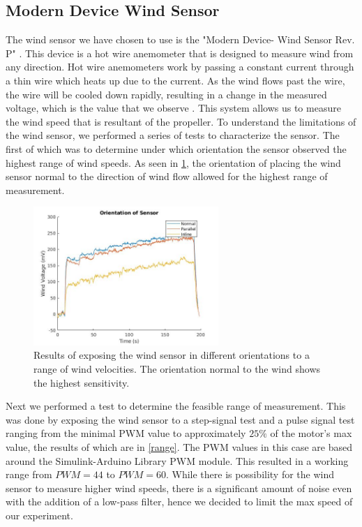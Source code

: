 \documentclass[conference]{IEEEtran}
\begin{document}
\subsection{Modern Device Wind Sensor}
The wind sensor we have chosen to use is the "Modern Device- Wind Sensor Rev. P" \cite{md}. This device is a hot wire anemometer that is designed to measure wind from any direction. Hot wire anemometers work by passing a constant current through a thin wire which heats up due to the current. As the wind flows past the wire, the wire will be cooled down rapidly, resulting in a change in the measured voltage, which is the value that we observe \cite{hot_wire}. This system allows us to measure the wind speed that is resultant of the propeller. 
To understand the limitations of the wind sensor, we performed a series of tests to characterize the sensor. The first of which was to determine under which orientation the sensor observed the highest range of wind speeds. As seen in \ref{orientation}, the orientation of placing the wind sensor normal to the direction of wind flow allowed for the highest range of measurement. 
	\begin{figure}[htbp]
	\includegraphics[width=7cm]{images/figure_1/orientation.jpg}
	\caption{Results of exposing the wind sensor in different orientations to a range of wind velocities. The orientation normal to the wind shows the highest sensitivity. }
	\label{orientation}
\end{figure}
Next we performed a test to determine the feasible range of measurement. This was done by exposing the wind sensor to a step-signal test and a pulse signal test ranging from the minimal PWM value to approximately $25\%$ of the motor's max value, the results of which are in \ref{range}. The PWM values in this case are based around the Simulink-Arduino Library PWM module.  This resulted in a working range from $PWM = 44$ to $PWM = 60$. While there is possibility for the wind sensor to measure higher wind speeds, there is a significant amount of noise even with the addition of a low-pass filter, hence we decided to limit the max speed of our experiment.
\end{document}

